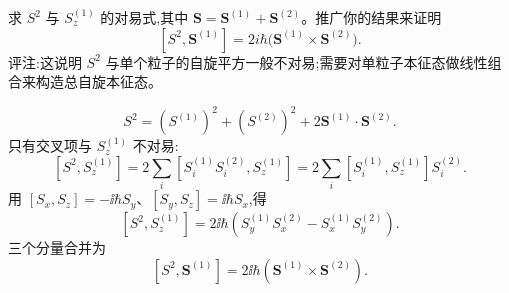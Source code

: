 \begin{question}
求 $S^2$ 与 $S_z^{(1)}$ 的对易式,其中 $\mathbf S=\mathbf S^{(1)}+\mathbf S^{(2)}$。推广你的结果来证明
\[
[S^2,\mathbf S^{(1)}]=2i\hbar\bigl(\mathbf S^{(1)}\times\mathbf S^{(2)}\bigr).
\]
评注:这说明 $S^2$ 与单个粒子的自旋平方一般不对易;需要对单粒子本征态做线性组合来构造总自旋本征态。
\begin{solution}

\[
S^2=(S^{(1)})^2+(S^{(2)})^2+2\mathbf S^{(1)}\cdot\mathbf S^{(2)}.
\]
只有交叉项与 $S_z^{(1)}$ 不对易:
\[
[S^2,S_z^{(1)}]=2\sum_i[S_i^{(1)}S_i^{(2)},S_z^{(1)}]
=2\sum_i[S_i^{(1)},S_z^{(1)}]S_i^{(2)}.
\]
用 $[S_x,S_z]=-\ii\hbar S_y$、$[S_y,S_z]=\ii\hbar S_x$,得
\[
[S^2,S_z^{(1)}]=2\ii\hbar(S_y^{(1)}S_x^{(2)}-S_x^{(1)}S_y^{(2)}).
\]
三个分量合并为
\[
[S^2,\mathbf S^{(1)}]=2\ii\hbar(\mathbf S^{(1)}\times\mathbf S^{(2)}).
\]

\end{solution}
\end{question}

